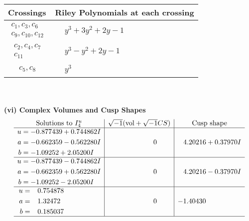 \documentclass[1p]{elsarticle_modified}
\theoremstyle{definition}
\newcommand{\I}{\sqrt{-1}}
\begin{document}
\begin{tabular}{m{50pt}|m{274pt}}
Crossings & \hspace{64pt}Riley Polynomials at each crossing \\
\hline $$\begin{aligned}c_{1},c_{3},c_{6}\\c_{9},c_{10},c_{12}\end{aligned}$$&$\begin{aligned}
&y^3+3 y^2+2 y-1
\end{aligned}$\\
\hline $$\begin{aligned}c_{2},c_{4},c_{7}\\c_{11}\end{aligned}$$&$\begin{aligned}
&y^3- y^2+2 y-1
\end{aligned}$\\
\hline $$\begin{aligned}c_{5},c_{8}\end{aligned}$$&$\begin{aligned}
&y^3
\end{aligned}$\\
\hline
\end{tabular}\\~\\
\newpage\flushleft \textbf{(vi) Complex Volumes and Cusp Shapes}
$$\begin{array}{c|c|c}  
\text{Solutions to }I^u_{4}& \I (\text{vol} + \sqrt{-1}CS) & \text{Cusp shape}\\
 \hline 
\begin{aligned}
u &= -0.877439 + 0.744862 I \\
a &= -0.662359 - 0.562280 I \\
b &= -1.09252 + 2.05200 I\end{aligned}
 & \phantom{-0.000000 } 0 & \phantom{-}4.20216 + 0.37970 I \\ \hline\begin{aligned}
u &= -0.877439 - 0.744862 I \\
a &= -0.662359 + 0.562280 I \\
b &= -1.09252 - 2.05200 I\end{aligned}
 & \phantom{-0.000000 } 0 & \phantom{-}4.20216 - 0.37970 I \\ \hline\begin{aligned}
u &= \phantom{-}0.754878\phantom{ +0.000000I} \\
a &= \phantom{-}1.32472\phantom{ +0.000000I} \\
b &= \phantom{-}0.185037\phantom{ +0.000000I}\end{aligned}
 & \phantom{-0.000000 } 0 & -1.40430\phantom{ +0.000000I}\\
 \hline 
 \end{array}$$\newpage
\end{document}
